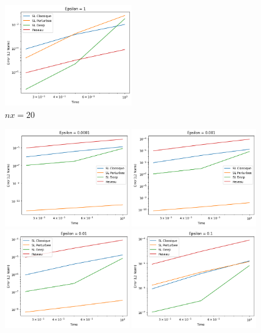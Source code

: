 \documentclass{article}
\begin{document}
\begin{figure}[htbp]
    \includegraphics[width=0.49\textwidth]{images/20ep25.png}
    \caption{$nx = 20$}
\end{figure}

\begin{figure}[!h]
    \centering
    \includegraphics[width=0.48\textwidth]{images/ep21.png}
    \includegraphics[width=0.48\textwidth]{images/ep22.png}
    \includegraphics[width=0.48\textwidth]{images/ep23.png}
    \includegraphics[width=0.48\textwidth]{images/ep24.png}

\end{figure}
\end{document}
